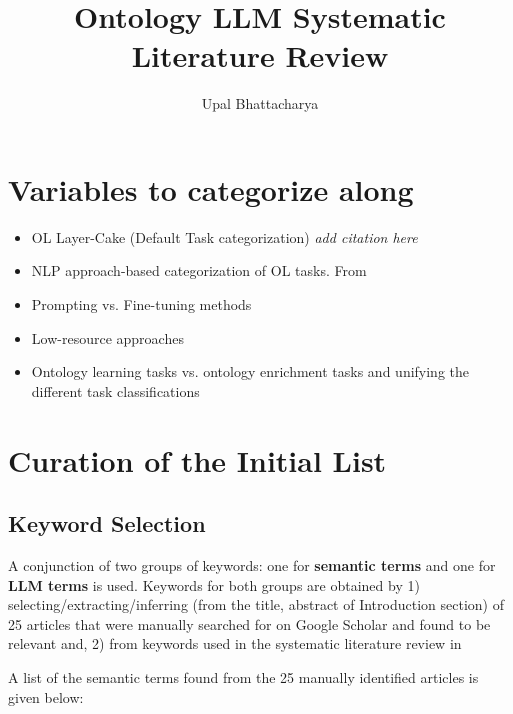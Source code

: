 \documentclass[a4paper,colorinlistoftodos]{article}
\author{Upal Bhattacharya}
\date{}
\title{Ontology LLM Systematic Literature Review}
\begin{document}
\maketitle

\begingroup
    \hypersetup{linkcolor=black}
    \tableofcontents
    \listoftodos
    \pagebreak
\endgroup

\linenumbers

\section{Variables to categorize along}
\label{sec:variables}

\begin{itemize}
\item OL Layer-Cake (Default Task categorization) \textit{add citation here}
\item NLP approach-based categorization of OL tasks.
  From \cite{du2024ShortReviewOntology}
\item Prompting vs. Fine-tuning methods
\item Low-resource approaches
\item Ontology learning tasks vs. ontology enrichment tasks and unifying the
  different task classifications
\end{itemize}

\section{Curation of the Initial List}
\label{sec:initial-list-curation}

\subsection{Keyword Selection}
\label{subsec:keyword-selection}

A conjunction of two groups of keywords: one for \textbf{semantic terms} and
one for \textbf{LLM terms} is used. Keywords for both groups are obtained by
1) selecting/extracting/inferring (from the title, abstract of Introduction
section) of 25 articles that were manually searched for on Google Scholar and
found to be relevant and, 2) from keywords used in the systematic literature
review in \citet{li2025LargeLanguageModels}

A list of the semantic terms found from the 25 manually identified articles is
given below:
\end{document}
